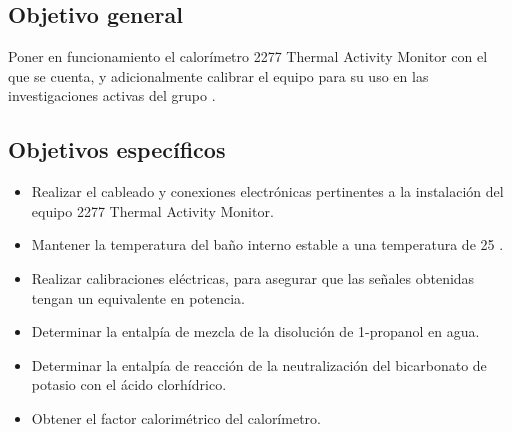 	\subsection{Objetivo general}
		Poner en funcionamiento el calorímetro 2277 Thermal Activity Monitor con el que se cuenta, y adicionalmente calibrar el equipo para su uso en las investigaciones activas del grupo \groupname.
		
	\subsection{Objetivos específicos}
		\begin{itemize}
			\item Realizar el cableado y conexiones electrónicas pertinentes a la instalaci\'on del equipo 2277 Thermal Activity Monitor.
			\item Mantener la temperatura del ba\~no interno estable a una temperatura de 25 \grad{}.
			\item Realizar calibraciones eléctricas, para asegurar que las señales obtenidas tengan un equivalente en potencia.
			\item Determinar la entalpía de mezcla de la disolución de 1-propanol en agua.
			\item Determinar la entalpía de reacción de la neutralización del bicarbonato de potasio con el \'acido clorhídrico.
			\item Obtener el factor calorimétrico del calorímetro.
		\end{itemize}
